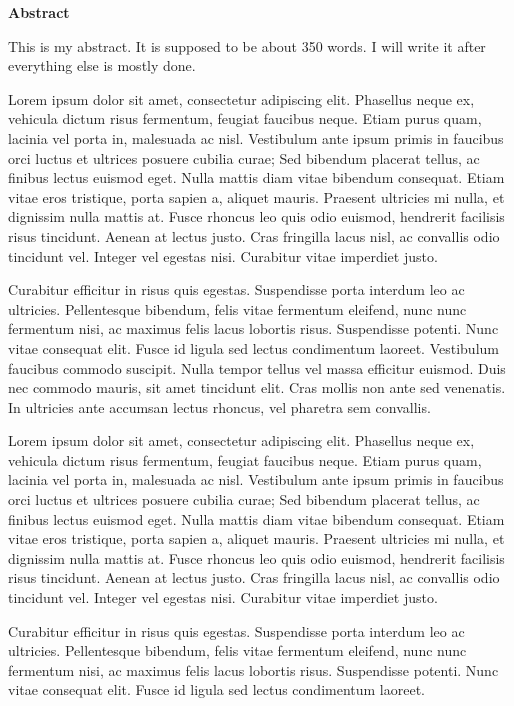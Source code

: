 \newpage

{\centering \sffamily \bfseries \large Abstract \\ [24pt]}

This is my abstract. It is supposed to be about 350 words. I will write it after everything else is mostly done.

Lorem ipsum dolor sit amet, consectetur adipiscing elit. Phasellus neque ex, vehicula dictum risus fermentum, feugiat faucibus neque. Etiam purus quam, lacinia vel porta in, malesuada ac nisl. Vestibulum ante ipsum primis in faucibus orci luctus et ultrices posuere cubilia curae; Sed bibendum placerat tellus, ac finibus lectus euismod eget. Nulla mattis diam vitae bibendum consequat. Etiam vitae eros tristique, porta sapien a, aliquet mauris. Praesent ultricies mi nulla, et dignissim nulla mattis at. Fusce rhoncus leo quis odio euismod, hendrerit facilisis risus tincidunt. Aenean at lectus justo. Cras fringilla lacus nisl, ac convallis odio tincidunt vel. Integer vel egestas nisi. Curabitur vitae imperdiet justo.

Curabitur efficitur in risus quis egestas. Suspendisse porta interdum leo ac ultricies. Pellentesque bibendum, felis vitae fermentum eleifend, nunc nunc fermentum nisi, ac maximus felis lacus lobortis risus. Suspendisse potenti. Nunc vitae consequat elit. Fusce id ligula sed lectus condimentum laoreet. Vestibulum faucibus commodo suscipit. Nulla tempor tellus vel massa efficitur euismod. Duis nec commodo mauris, sit amet tincidunt elit. Cras mollis non ante sed venenatis. In ultricies ante accumsan lectus rhoncus, vel pharetra sem convallis.

Lorem ipsum dolor sit amet, consectetur adipiscing elit. Phasellus neque ex, vehicula dictum risus fermentum, feugiat faucibus neque. Etiam purus quam, lacinia vel porta in, malesuada ac nisl. Vestibulum ante ipsum primis in faucibus orci luctus et ultrices posuere cubilia curae; Sed bibendum placerat tellus, ac finibus lectus euismod eget. Nulla mattis diam vitae bibendum consequat. Etiam vitae eros tristique, porta sapien a, aliquet mauris. Praesent ultricies mi nulla, et dignissim nulla mattis at. Fusce rhoncus leo quis odio euismod, hendrerit facilisis risus tincidunt. Aenean at lectus justo. Cras fringilla lacus nisl, ac convallis odio tincidunt vel. Integer vel egestas nisi. Curabitur vitae imperdiet justo.

Curabitur efficitur in risus quis egestas. Suspendisse porta interdum leo ac ultricies. Pellentesque bibendum, felis vitae fermentum eleifend, nunc nunc fermentum nisi, ac maximus felis lacus lobortis risus. Suspendisse potenti. Nunc vitae consequat elit. Fusce id ligula sed lectus condimentum laoreet.